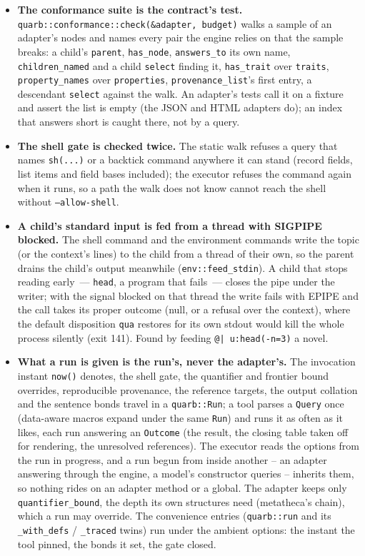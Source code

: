 \documentclass{report}
\begin{document}
\begin{itemize}
\item \textbf{The conformance suite is the contract's test.}
  \texttt{quarb::conformance::check(\&adapter, budget)} walks a
  sample of an adapter's nodes and names every pair the engine
  relies on that the sample breaks: a child's \texttt{parent},
  \texttt{has\_node}, \texttt{answers\_to} its own name,
  \texttt{children\_named} and a child \texttt{select} finding
  it, \texttt{has\_trait} over \texttt{traits},
  \texttt{property\_names} over \texttt{properties},
  \texttt{provenance\_list}'s first entry, a descendant
  \texttt{select} against the walk. An adapter's tests call it on
  a fixture and assert the list is empty (the JSON and HTML
  adapters do); an index that answers short is caught there, not
  by a query.

\item \textbf{The shell gate is checked twice.} The static walk
  refuses a query that names \texttt{sh(...)} or a backtick
  command anywhere it can stand (record fields, list items and
  field bases included); the executor refuses the command again
  when it runs, so a path the walk does not know cannot reach
  the shell without \texttt{--allow-shell}.

\item \textbf{A child's standard input is fed from a thread
  with SIGPIPE blocked.} The shell command and the environment
  commands write the topic (or the context's lines) to the child
  from a thread of their own, so the parent drains the child's
  output meanwhile (\texttt{env::feed\_stdin}). A child that stops
  reading early~--- \texttt{head}, a program that fails~--- closes
  the pipe under the writer; with the signal blocked on that
  thread the write fails with EPIPE and the call takes its proper
  outcome (null, or a refusal over the context), where the
  default disposition \texttt{qua} restores for its own stdout
  would kill the whole process silently (exit 141). Found by
  feeding \texttt{@| u:head(-n=3)} a novel.

\item \textbf{What a run is given is the run's, never the
  adapter's.} The invocation instant \texttt{now()} denotes, the
  shell gate, the quantifier and frontier bound overrides, reproducible
  provenance, the reference targets, the output collation and the
  sentence bonds travel in a \texttt{quarb::Run}; a tool parses a
  \texttt{Query} once (data-aware macros expand under the same
  \texttt{Run}) and runs it as often as it likes, each run
  answering an \texttt{Outcome} (the result, the closing table
  taken off for rendering, the unresolved references). The
  executor reads the options from the run in progress, and a run
  begun from inside another -- an adapter answering through the
  engine, a model's constructor queries -- inherits them, so
  nothing rides on an adapter method or a global. The adapter
  keeps only \texttt{quantifier\_bound}, the depth its own
  structures need (metatheca's chain), which a run may override.
  The convenience entries (\texttt{quarb::run} and its
  \texttt{\_with\_defs} / \texttt{\_traced} twins) run under the
  ambient options: the instant the tool pinned, the bonds it set,
  the gate closed.


\end{itemize}
\end{document}
